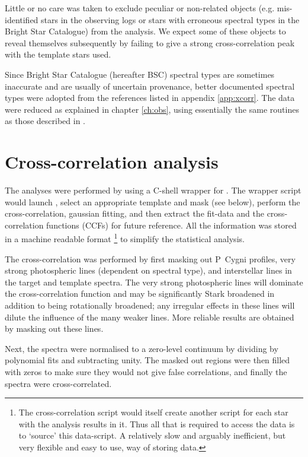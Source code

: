Little or no care was taken to exclude peculiar or non-related objects
(e.g. mis-identified stars in the observing logs or stars with
erroneous spectral types in the Bright Star Catalogue) from the
analysis. We expect some of these objects to reveal themselves
subsequently by failing to give a strong cross-correlation peak with
the template stars used.

Since Bright Star Catalogue (hereafter BSC) spectral types are
sometimes inaccurate and are usually of uncertain provenance, better
documented spectral types were adopted from 
the references listed in appendix \ref{app:xcorr}. The data were
reduced as explained in chapter \ref{ch:obs}, using essentially the
same routines as those described in .

\section{Cross-correlation analysis}
\label{sec:xcorr:analysis}

The analyses were performed by using a C-shell wrapper for \dipso. The
wrapper script would launch \dipso, select an appropriate template and
mask (see below), perform the cross-correlation, gaussian fitting,
and then extract the fit-data and the cross-correlation functions
(CCFs) for future reference. All the information was stored in a
machine readable format%
%
\footnote{The cross-correlation script would
itself create another script for each star with the analysis results
in it. Thus all that is required to access the data is to `source'
this data-script. A relatively slow and arguably inefficient, but very
flexible and easy to use, way of storing data.}
%
to simplify the statistical analysis.

The cross-correlation was performed by first masking out P~Cygni
profiles, very strong photospheric lines (dependent on spectral type), and
interstellar lines in the target and template spectra. The very
strong photospheric lines will dominate the cross-correlation function
and may be significantly Stark broadened in addition to being
rotationally broadened; any irregular effects in these lines will
dilute the influence of the many weaker lines. More reliable results
are obtained by masking out these lines.

Next, the spectra were normalised to a zero-level continuum by
dividing by polynomial fits and subtracting unity. The masked out
regions were then filled with zeros to make sure they would not give
false correlations, and finally the spectra were cross-correlated.

